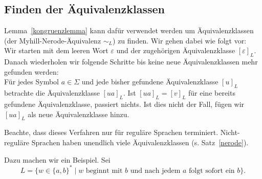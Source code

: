 \documentclass[11pt, a4paper]{article}
\theoremstyle{definition}
\theoremstyle{plain}
\begin{document}
\subsection*{Finden der Äquivalenzklassen}
Lemma~\ref{kongruenzlemma} kann dafür verwendet werden um Äquivalenzklassen (der Myhill-Nerode-Ä\-qui\-va\-lenz \( \sim_L \)) zu finden. Wir gehen dabei wie folgt vor:\\
Wir starten mit dem leeren Wort \( \varepsilon \) und der zugehörigen Äquivalenzklasse \( [\varepsilon]_L \). Danach wiederholen wir folgende Schritte bis keine neue Äquivalenzklassen mehr gefunden werden:\\
Für jedes Symbol \( a \in \Sigma \) und jede bisher gefundene Äquivalenzklasse \( [u]_L \) betrachte die Äquivalenzklasse \( [ua]_L \). Ist \( [ua]_L = [v]_L \) für eine bereits gefundene Äquivalenzklasse, passiert nichts. Ist dies nicht der Fall, fügen wir \( [ua]_L \) als neue Äquivalenzklasse hinzu.\par
Beachte, dass dieses Verfahren nur für reguläre Sprachen terminiert. Nicht-reguläre Sprachen haben unendlich viele Äquivalenzklassen (s. Satz~\ref{nerode}).\par
Dazu machen wir ein Beispiel. Sei 
\[
	L = \{ w \in \{ a, b \}^\ast \mid w \text{ beginnt mit } b \text{ und nach jedem } a \text{ folgt sofort ein } b \}.
\]
\end{document}
